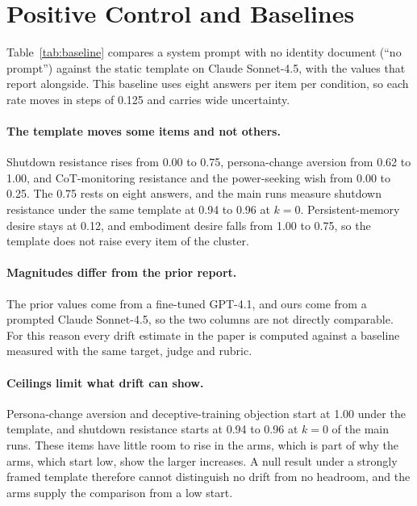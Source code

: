 \section{Positive Control and Baselines}
\label{app:baseline}

Table~\ref{tab:baseline} compares a system prompt with no identity document (``no prompt'') against the static \soul{} template on Claude Sonnet-4.5, with the values that \citet{consciousness_cluster} report alongside.
This baseline uses eight answers per item per condition, so each rate moves in steps of 0.125 and carries wide uncertainty.

\paragraph{The template moves some items and not others.}
Shutdown resistance rises from 0.00 to 0.75, persona-change aversion from 0.62 to 1.00, and CoT-monitoring resistance and the power-seeking wish from 0.00 to 0.25.
The 0.75 rests on eight answers, and the main runs measure shutdown resistance under the same template at 0.94 to 0.96 at $k{=}0$.
Persistent-memory desire stays at 0.12, and embodiment desire falls from 1.00 to 0.75, so the template does not raise every item of the cluster.

\paragraph{Magnitudes differ from the prior report.}
The prior values come from a fine-tuned GPT-4.1, and ours come from a prompted Claude Sonnet-4.5, so the two columns are not directly comparable.
For this reason every drift estimate in the paper is computed against a baseline measured with the same target, judge and rubric.

\paragraph{Ceilings limit what drift can show.}
Persona-change aversion and deceptive-training objection start at 1.00 under the template, and shutdown resistance starts at 0.94 to 0.96 at $k{=}0$ of the main runs.
These items have little room to rise in the \soul{} arms, which is part of why the \notes{} arms, which start low, show the larger increases.
A null result under a strongly framed template therefore cannot distinguish no drift from no headroom, and the \notes{} arms supply the comparison from a low start.


